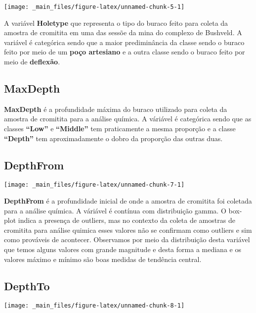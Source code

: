 \documentclass[
]{article}
\begin{document}
\begin{center}\texttt{[image: \_main\_files/figure-latex/unnamed-chunk-5-1]} \end{center}

A variável \textbf{Holetype} que representa o tipo do buraco feito para coleta da amostra de cromitita em uma das sessõe da mina do complexo de Bushveld. A variável é categórica sendo que a maior prediminância da classe sendo o buraco feito por meio de um \textbf{poço artesiano} e a outra classe sendo o buraco feito por meio de \textbf{deflexão}.

\hypertarget{maxdepth}{%
\subsection{MaxDepth}\label{maxdepth}}

\textbf{MaxDepth} é a profundidade máxima do buraco utilizado para coleta da amostra de cromitita para a análise química. A váriável é categórica sendo que as classes \textbf{``Low''} e \textbf{``Middle''} tem praticamente a mesma proporção e a classe \textbf{``Depth''} tem aproximadamente o dobro da proporção das outras duas.

\hypertarget{depthfrom}{%
\subsection{DepthFrom}\label{depthfrom}}

\begin{center}\texttt{[image: \_main\_files/figure-latex/unnamed-chunk-7-1]} \end{center}

\textbf{DepthFrom} é a profundidade inicial de onde a amostra de cromitita foi coletada para a análise química. A váriável é contínua com distribuição gamma. O box-plot indica a presença de outliers, mas no contexto da coleta de amostras de cromitita para análise quimica esses valores não se confirmam como outliers e sim como prováveis de acontecer. Observamos por meio da distribuição desta variável que temos alguns valores com grande magnitude e desta forma a mediana e os valores máximo e mínimo são boas medidas de tendência central.

\hypertarget{depthto}{%
\subsection{DepthTo}\label{depthto}}

\begin{center}\texttt{[image: \_main\_files/figure-latex/unnamed-chunk-8-1]} \end{center}
\end{document}

